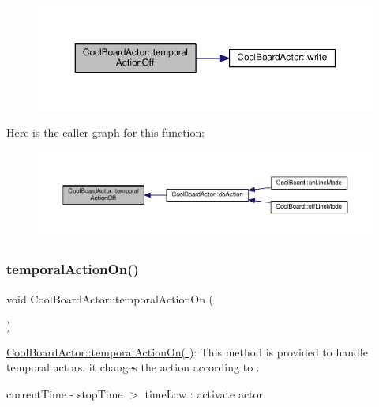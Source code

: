 \nopagebreak
\begin{figure}[H]
\begin{center}
\leavevmode
\includegraphics[width=350pt]{dc/d69/class_cool_board_actor_a02698bd647df49cabbe74513d4d88918_cgraph}
\end{center}
\end{figure}
Here is the caller graph for this function\+:
\nopagebreak
\begin{figure}[H]
\begin{center}
\leavevmode
\includegraphics[width=350pt]{dc/d69/class_cool_board_actor_a02698bd647df49cabbe74513d4d88918_icgraph}
\end{center}
\end{figure}
\mbox{\label{class_cool_board_actor_ada603785c203fdb0b41cc967d70bdc4d}} 
\subsubsection{\texorpdfstring{temporal\+Action\+On()}{temporalActionOn()}}
{\footnotesize\ttfamily void Cool\+Board\+Actor\+::temporal\+Action\+On (\begin{DoxyParamCaption}{ }\end{DoxyParamCaption})}

\hyperlink{class_cool_board_actor_ada603785c203fdb0b41cc967d70bdc4d}{Cool\+Board\+Actor\+::temporal\+Action\+On( )}\+: This method is provided to handle temporal actors. it changes the action according to \+:

current\+Time -\/ stop\+Time $>$ time\+Low \+: activate actor 

